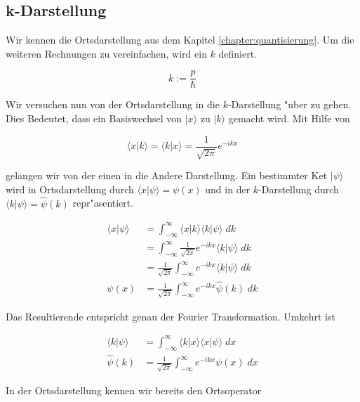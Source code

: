 \begin{refsection}
\section{k-Darstellung}


Wir kennen die Ortsdarstellung aus dem Kapitel \ref{chapter:quantisierung}. Um die weiteren Rechnungen zu vereinfachen, wird ein $k$ definiert.

\begin{equation}
k := \frac{p}{\hbar}
\end{equation}

Wir versuchen nun von der Ortsdarstellung in die $k$-Darstellung "uber zu gehen. Dies Bedeutet, dass ein Basiswechsel von $\vert x\rangle$ zu $\vert k\rangle$ gemacht wird. Mit Hilfe von

\begin{equation}
\langle x\vert k\rangle= \langle k\vert x\rangle =\frac{1}{\sqrt{2\pi }}e^{-ikx} 
\end{equation}

gelangen wir von der einen in die Andere Darstellung. Ein bestimmter Ket $|\psi\rangle$ wird in Ortsdarstellung durch $\langle x\vert \psi\rangle = \psi(x)$ und in der $k$-Darstellung durch $\langle k\vert \psi\rangle = \hat{\psi}(k)$ repr"asentiert.

\begin{align}
\langle x\vert \psi\rangle &= \int_{-\infty}^{\infty} \langle x\vert k\rangle \langle k\vert \psi\rangle \; dk\\
&=\int_{-\infty}^{\infty} \frac{1}{\sqrt{2\pi }}e^{-ikx}  \langle k\vert \psi\rangle \; dk\\
&= \frac{1}{\sqrt{2\pi }} \int_{-\infty}^{\infty} e^{-ikx}  \langle k\vert \psi\rangle \; dk\\
\psi(x) &= \frac{1}{\sqrt{2\pi }} \int_{-\infty}^{\infty} e^{-ikx} \hat{\psi}(k) \; dk
\end{align}

Das Resultierende entspricht genau der Fourier Transformation. Umkehrt ist

\begin{align}
\langle k\vert \psi\rangle &= \int_{-\infty}^{\infty} \langle k\vert x\rangle \langle x\vert \psi\rangle \; dx\\
\hat{\psi}(k) &= \frac{1}{\sqrt{2\pi}} \int_{-\infty}^{\infty} e^{-ikx} {\psi}(x) \; dx
\end{align}

In der Ortsdarstellung kennen wir bereits den Ortsoperator


\end{refsection}
